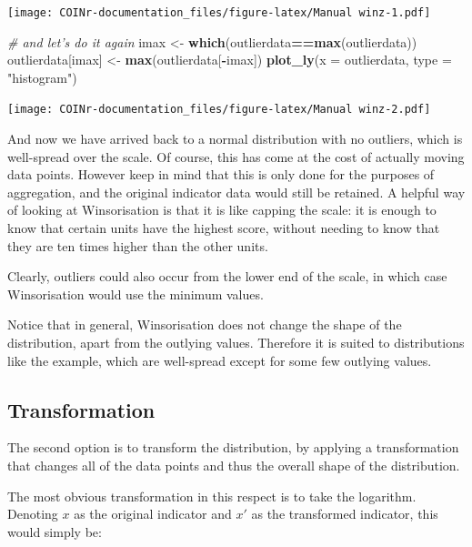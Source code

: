\documentclass[
]{book}
\newenvironment{Shaded}{\begin{snugshade}}{\end{snugshade}}
\newcommand{\CommentTok}[1]{\textcolor[rgb]{0.56,0.35,0.01}{\textit{#1}}}
\newcommand{\DataTypeTok}[1]{\textcolor[rgb]{0.13,0.29,0.53}{#1}}
\newcommand{\KeywordTok}[1]{\textcolor[rgb]{0.13,0.29,0.53}{\textbf{#1}}}
\newcommand{\NormalTok}[1]{#1}
\newcommand{\OperatorTok}[1]{\textcolor[rgb]{0.81,0.36,0.00}{\textbf{#1}}}
\newcommand{\StringTok}[1]{\textcolor[rgb]{0.31,0.60,0.02}{#1}}
\begin{document}
\texttt{[image: COINr-documentation\_files/figure-latex/Manual winz-1.pdf]}

\begin{Shaded}
\begin{Highlighting}[]

\CommentTok{# and let's do it again}
\NormalTok{imax <-}\StringTok{ }\KeywordTok{which}\NormalTok{(outlierdata}\OperatorTok{==}\KeywordTok{max}\NormalTok{(outlierdata))}
\NormalTok{outlierdata[imax] <-}\StringTok{ }\KeywordTok{max}\NormalTok{(outlierdata[}\OperatorTok{-}\NormalTok{imax])}
\KeywordTok{plot_ly}\NormalTok{(}\DataTypeTok{x =}\NormalTok{ outlierdata, }\DataTypeTok{type =} \StringTok{"histogram"}\NormalTok{)}
\end{Highlighting}
\end{Shaded}

\texttt{[image: COINr-documentation\_files/figure-latex/Manual winz-2.pdf]}

And now we have arrived back to a normal distribution with no outliers, which is well-spread over the scale. Of course, this has come at the cost of actually moving data points. However keep in mind that this is only done for the purposes of aggregation, and the original indicator data would still be retained. A helpful way of looking at Winsorisation is that it is like capping the scale: it is enough to know that certain units have the highest score, without needing to know that they are ten times higher than the other units.

Clearly, outliers could also occur from the lower end of the scale, in which case Winsorisation would use the minimum values.

Notice that in general, Winsorisation does not change the shape of the distribution, apart from the outlying values. Therefore it is suited to distributions like the example, which are well-spread except for some few outlying values.

\hypertarget{transformation}{%
\subsection{Transformation}\label{transformation}}

The second option is to transform the distribution, by applying a transformation that changes all of the data points and thus the overall shape of the distribution.

The most obvious transformation in this respect is to take the logarithm. Denoting \(x\) as the original indicator and \(x'\) as the transformed indicator, this would simply be:
\end{document}
